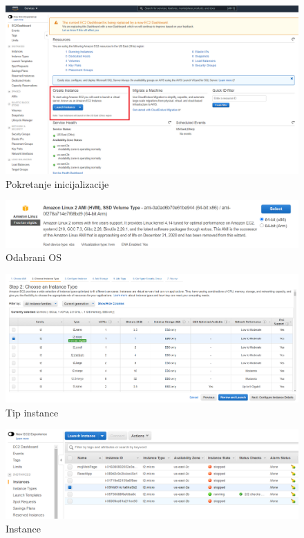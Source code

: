 			\begin{figure}[h]
				\includegraphics[width=\textwidth]{slike/deployment_slike/launchingInstance.png}
				\centering
				\caption{Pokretanje inicijalizacije}
			\end{figure}
		
			\begin{figure}[h]
				\includegraphics[width=\textwidth]{slike/deployment_slike/virtualOS.png}
				\centering
				\caption{Odabrani OS}
			\end{figure}
		
			\begin{figure}[h]
				\includegraphics[width=\textwidth]{slike/deployment_slike/instanceType.png}
				\centering
				\caption{Tip instance}
			\end{figure}
			
			\begin{figure}[h]
				\includegraphics[width=\textwidth]{slike/deployment_slike/mojeInstance.png}
				\centering
				\caption{Instance}
			\end{figure}
			
